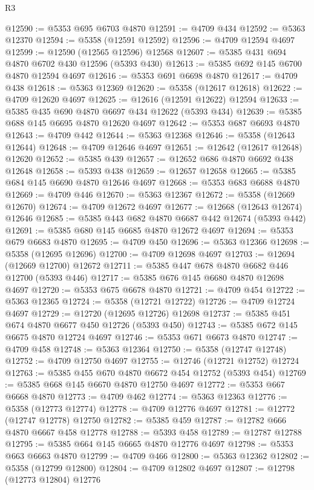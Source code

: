 \begin{lexlean}{R3}
\begin{coremodule}
@12590 := @5353 @695 @6703 @4870
@12591 := @4709 @434
@12592 := @5363 @12370
@12594 := @5358 (@12591 @12592)
@12596 := @4709 @12594 @4697
@12599 := @12590 (@12565 @12596) @12568
@12607 := @5385 @431 @694 @4870 @6702 @430 @12596 (@5393 @430)
@12613 := @5385 @692 @145 @6700 @4870 @12594 @4697
@12616 := @5353 @691 @6698 @4870
@12617 := @4709 @438
@12618 := @5363 @12369
@12620 := @5358 (@12617 @12618)
@12622 := @4709 @12620 @4697
@12625 := @12616 (@12591 @12622) @12594
@12633 := @5385 @435 @690 @4870 @6697 @434 @12622 (@5393 @434)
@12639 := @5385 @688 @145 @6695 @4870 @12620 @4697
@12642 := @5353 @687 @6693 @4870
@12643 := @4709 @442
@12644 := @5363 @12368
@12646 := @5358 (@12643 @12644)
@12648 := @4709 @12646 @4697
@12651 := @12642 (@12617 @12648) @12620
@12652 := @5385 @439
@12657 := @12652 @686 @4870 @6692 @438 @12648
@12658 := @5393 @438
@12659 := @12657 @12658
@12665 := @5385 @684 @145 @6690 @4870 @12646 @4697
@12668 := @5353 @683 @6688 @4870
@12669 := @4709 @446
@12670 := @5363 @12367
@12672 := @5358 (@12669 @12670)
@12674 := @4709 @12672 @4697
@12677 := @12668 (@12643 @12674) @12646
@12685 := @5385 @443 @682 @4870 @6687 @442 @12674 (@5393 @442)
@12691 := @5385 @680 @145 @6685 @4870 @12672 @4697
@12694 := @5353 @679 @6683 @4870
@12695 := @4709 @450
@12696 := @5363 @12366
@12698 := @5358 (@12695 @12696)
@12700 := @4709 @12698 @4697
@12703 := @12694 (@12669 @12700) @12672
@12711 := @5385 @447 @678 @4870 @6682 @446 @12700 (@5393 @446)
@12717 := @5385 @676 @145 @6680 @4870 @12698 @4697
@12720 := @5353 @675 @6678 @4870
@12721 := @4709 @454
@12722 := @5363 @12365
@12724 := @5358 (@12721 @12722)
@12726 := @4709 @12724 @4697
@12729 := @12720 (@12695 @12726) @12698
@12737 := @5385 @451 @674 @4870 @6677 @450 @12726 (@5393 @450)
@12743 := @5385 @672 @145 @6675 @4870 @12724 @4697
@12746 := @5353 @671 @6673 @4870
@12747 := @4709 @458
@12748 := @5363 @12364
@12750 := @5358 (@12747 @12748)
@12752 := @4709 @12750 @4697
@12755 := @12746 (@12721 @12752) @12724
@12763 := @5385 @455 @670 @4870 @6672 @454 @12752 (@5393 @454)
@12769 := @5385 @668 @145 @6670 @4870 @12750 @4697
@12772 := @5353 @667 @6668 @4870
@12773 := @4709 @462
@12774 := @5363 @12363
@12776 := @5358 (@12773 @12774)
@12778 := @4709 @12776 @4697
@12781 := @12772 (@12747 @12778) @12750
@12782 := @5385 @459
@12787 := @12782 @666 @4870 @6667 @458 @12778
@12788 := @5393 @458
@12789 := @12787 @12788
@12795 := @5385 @664 @145 @6665 @4870 @12776 @4697
@12798 := @5353 @663 @6663 @4870
@12799 := @4709 @466
@12800 := @5363 @12362
@12802 := @5358 (@12799 @12800)
@12804 := @4709 @12802 @4697
@12807 := @12798 (@12773 @12804) @12776

\end{coremodule}
\end{lexlean}
